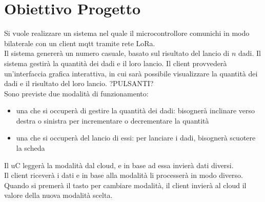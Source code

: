 \section{Obiettivo Progetto}
Si vuole realizzare un sistema nel quale il microcontrollore comunichi in modo bilaterale con un client mqtt tramite rete LoRa.
\\Il sistema genererà un numero casuale, basato sul risultato del lancio di $n$ dadi. Il sistema gestirà la quantità dei dadi e il loro lancio. Il client provvederà un'interfaccia grafica interattiva, in cui sarà possibile visualizzare la quantità dei dadi e il risultato del loro lancio. ?PULSANTI?
\\Sono previste due modalità di funzionamento:
\begin{itemize}
  \item una che si occuperà di gestire la quantità dei dadi: bisognerà inclinare verso destra o sinistra per incrementare o decrementare la quantità
  \item una che si occuperà del lancio di essi: per lanciare i dadi, bisognerà scuotere la scheda
\end{itemize}
Il uC leggerà la modalità dal cloud, e in base ad essa invierà dati diversi.
\\Il client riceverà i dati e in base alla modalità li processerà in modo diverso. Quando si premerà il tasto per cambiare modalità, il client invierà al cloud il valore della nuova modalità scelta.





